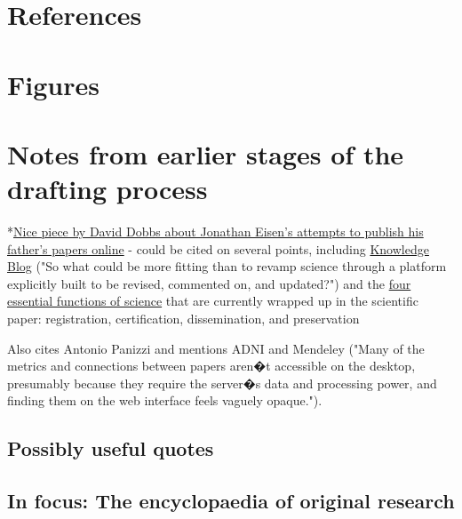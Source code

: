 \documentclass[final,authoryear,3p]{elsarticle-open-drafting}
\begin{document}
\begin{enumerate}
\section{References}

\section{Figures}

\section{Notes from earlier stages of the drafting process}



*\href{http://www.wired.com/wiredscience/2011/05/free-science-one-paper-at-a-time-2/all/1}{Nice piece by David Dobbs about Jonathan Eisen's attempts to publish his father's papers online} - could be cited on several points, including \href{http://knowledgeblog.org/}{Knowledge Blog} ("So what could be more fitting than to revamp science through a platform explicitly built to be revised, commented on, and updated?") and the \href{http://www.ariadne.ac.uk/issue7/fytton/}{four essential functions of science} that are currently wrapped up in the scientific paper: registration, certification, dissemination, and preservation

Also cites Antonio Panizzi and mentions ADNI and Mendeley ("Many of the metrics and connections between papers aren�t accessible on the desktop, presumably because they require the server�s data and processing power, and finding them on the web interface feels vaguely opaque.").

\subsection{Possibly useful quotes}


\subsection{In focus: The encyclopaedia of original research}


\end{enumerate}
\end{document}
